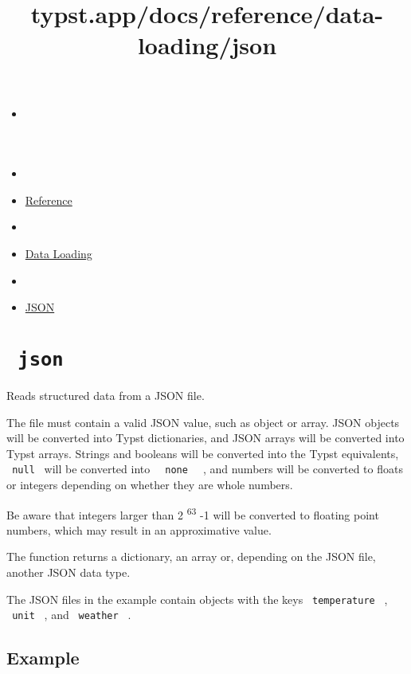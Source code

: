 \title{typst.app/docs/reference/data-loading/json}

\begin{itemize}
\tightlist
\item
  \href{/docs}{}
\item
  
\item
  \href{/docs/reference/}{Reference}
\item
  
\item
  \href{/docs/reference/data-loading/}{Data Loading}
\item
  
\item
  \href{/docs/reference/data-loading/json/}{JSON}
\end{itemize}

\section{\texorpdfstring{\texttt{\ json\ }}{ json }}\label{summary}

Reads structured data from a JSON file.

The file must contain a valid JSON value, such as object or array. JSON
objects will be converted into Typst dictionaries, and JSON arrays will
be converted into Typst arrays. Strings and booleans will be converted
into the Typst equivalents, \texttt{\ null\ } will be converted into
\texttt{\ }{\texttt{\ none\ }}\texttt{\ } , and numbers will be
converted to floats or integers depending on whether they are whole
numbers.

Be aware that integers larger than 2 \textsuperscript{63} -1 will be
converted to floating point numbers, which may result in an
approximative value.

The function returns a dictionary, an array or, depending on the JSON
file, another JSON data type.

The JSON files in the example contain objects with the keys
\texttt{\ temperature\ } , \texttt{\ unit\ } , and \texttt{\ weather\ }
.

\subsection{Example}\label{example}

